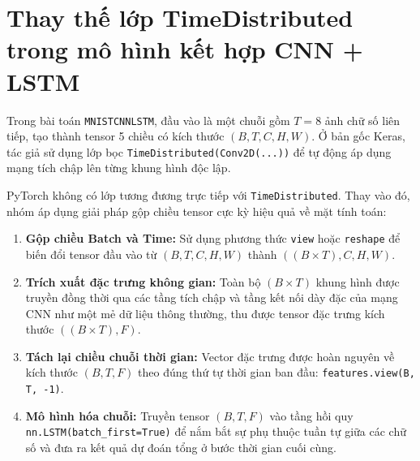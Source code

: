 \section{Thay thế lớp TimeDistributed trong mô hình kết hợp CNN + LSTM}
Trong bài toán \texttt{MNISTCNNLSTM}, đầu vào là một chuỗi gồm $T = 8$ ảnh chữ số liên tiếp, tạo thành tensor 5 chiều có kích thước $(B, T, C, H, W)$. Ở bản gốc Keras, tác giả sử dụng lớp bọc \texttt{TimeDistributed(Conv2D(...))} để tự động áp dụng mạng tích chập lên từng khung hình độc lập.

PyTorch không có lớp tương đương trực tiếp với \texttt{TimeDistributed}. Thay vào đó, nhóm áp dụng giải pháp gộp chiều tensor cực kỳ hiệu quả về mặt tính toán:
\begin{enumerate}
\item \textbf{Gộp chiều Batch và Time:} Sử dụng phương thức \texttt{view} hoặc \texttt{reshape} để biến đổi tensor đầu vào từ $(B, T, C, H, W)$ thành $((B \times T), C, H, W)$.
\item \textbf{Trích xuất đặc trưng không gian:} Toàn bộ $(B \times T)$ khung hình được truyền đồng thời qua các tầng tích chập và tầng kết nối dày đặc của mạng CNN như một mẻ dữ liệu thông thường, thu được tensor đặc trưng kích thước $((B \times T), F)$.
\item \textbf{Tách lại chiều chuỗi thời gian:} Vector đặc trưng được hoàn nguyên về kích thước $(B, T, F)$ theo đúng thứ tự thời gian ban đầu: \texttt{features.view(B, T, -1)}.
\item \textbf{Mô hình hóa chuỗi:} Truyền tensor $(B, T, F)$ vào tầng hồi quy \texttt{nn.LSTM(batch\_first=True)} để nắm bắt sự phụ thuộc tuần tự giữa các chữ số và đưa ra kết quả dự đoán tổng ở bước thời gian cuối cùng.
\end{enumerate}


